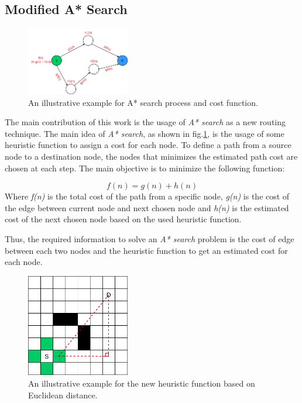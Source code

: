 \subsection{Modified A* Search}
\begin{figure}[hp]
    \centering
    \includegraphics[width=0.4\textwidth]{figures/a_star.png}
    \caption{An illustrative example for A* search process and cost function.}
    \label{fig:astar}
\end{figure}

The main contribution of this work is the usage of \emph{A* search} as a new routing technique. The main idea of \emph{A* search}, as shown in fig.\ref{fig:astar}, is the usage of some heuristic function to assign a cost for each node. To define a path from a source node to a destination node, the nodes that minimizes the estimated path cost are chosen at each step. The main objective is to minimize the following function:

\begin{equation} \label{eq:astar}
f(n) = g(n) + h(n)
\end{equation}
Where \emph{f(n)} is the total cost of the path from a specific node, \emph{g(n)} is the cost of the edge between current node and next chosen node and \emph{h(n)} is the estimated cost of the next chosen node based on the used heuristic function.

Thus, the required information to solve an \emph{A* search} problem is the cost of edge between each two nodes and the heuristic function to get an estimated cost for each node.

\begin{figure}[hp]
    \centering
    \includegraphics[width=0.4\textwidth]{figures/grid_euclid.png}
    \caption{An illustrative example for the new heuristic function based on Euclidean distance.}
    \label{fig:euclid}
\end{figure}


